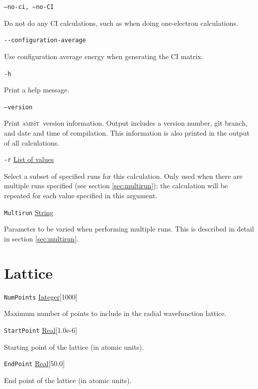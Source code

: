 \documentclass{report}
\newcommand{\ambit}{\textsc{amb}{\footnotesize i}\textsc{t}}
\begin{document}
\texttt{--no-ci, --no-CI}
\begin{adjustwidth}{1cm}{}
Do not do any CI calculations, such as when doing one-electron calculations.
\end{adjustwidth}

\texttt{{-}{-}configuration-average}
\begin{adjustwidth}{1cm}{}
Use configuration average energy when generating the CI matrix.
\end{adjustwidth}

\texttt{-h}
\begin{adjustwidth}{1cm}{}
Print a help message.
\end{adjustwidth}

\texttt{--version}
\begin{adjustwidth}{1cm}{}
Print \ambit\ version information. Output includes a version number, git branch, and date and time of 
compilation. This information is also printed in the output of all calculations.
\end{adjustwidth}

\texttt{-r} \uline{List of values}
\begin{adjustwidth}{1cm}{}
Select a subset of specified runs for this calculation. Only used when there are multiple runs specified
(see section \ref{sec:multirun}); the calculation will be repeated for each value specified in this
argument.
\end{adjustwidth}

\texttt{Multirun} \uline{String}
\begin{adjustwidth}{1cm}{}
Parameter to be varied when performing multiple runs. This is described in detail in section
\ref{sec:multirun}.
\end{adjustwidth}

\section{Lattice}

\texttt{NumPoints} \uline{Integer}[1000]
\begin{adjustwidth}{1cm}{}
Maximum number of points to include in the radial wavefunction lattice.
\end{adjustwidth}

\texttt{StartPoint} \uline{Real}[1.0e-6]
\begin{adjustwidth}{1cm}{}
Starting point of the lattice (in atomic units).
\end{adjustwidth}

\texttt{EndPoint} \uline{Real}[50.0]
\begin{adjustwidth}{1cm}{}
End point of the lattice (in atomic units).
\end{adjustwidth}
\end{document}
